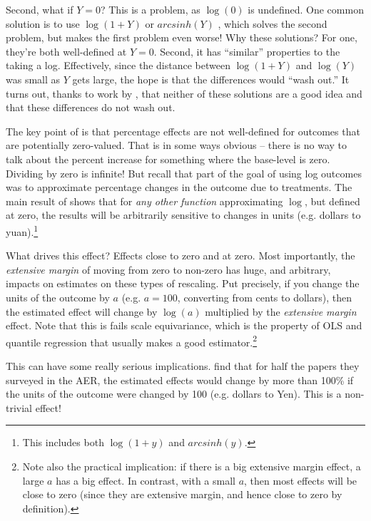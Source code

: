 \documentclass{tufte-handout}
\theoremstyle{break}
\begin{document}
Second, what if $Y = 0$? This is a problem, as $\log(0)$ is undefined. One common solution is to use $\log(1+Y)$ or $arcsinh(Y)$ \citep{MANNING2001461, ravallion2017concave, bellemare2020elasticities}, which solves the second problem, but makes the first problem even worse! \citep{ bellemare2020elasticities, aihounton2021units, cohn2022count} Why these solutions? For one, they're both well-defined at $Y=0$. Second, it has ``similar'' properties to the taking a log. Effectively, since the distance between $\log(1+Y)$ and $\log(Y)$ was small as $Y$ gets large, the hope is that the differences would ``wash out.''  It turns out, thanks to work by \citet{chen2023logs}, that neither of these solutions are a good idea and that these differences do not wash out.

The key point of \citet{chen2023logs} is that percentage effects are not well-defined for outcomes that are potentially zero-valued. That is in some ways obvious -- there is no way to talk about the percent increase for something where the base-level is zero. Dividing by zero is infinite! But recall that part of the goal of using log outcomes was to approximate percentage changes in the outcome due to treatments. The main result of \citet{chen2023logs} shows that for \emph{any other function} approximating $\log$, but defined at zero, the results will be arbitrarily sensitive to changes in units (e.g. dollars to yuan).\footnote{This includes both $\log(1+y)$ and $arcsinh(y)$.}  

What drives this effect? Effects close to zero and at zero. Most importantly, the \emph{extensive margin} of moving from zero to non-zero has huge, and arbitrary, impacts on estimates on these types of rescaling. Put precisely, if you change the units of the outcome by $a$ (e.g. $a=100$, converting from cents to dollars), then the estimated effect will change by $\log(a)$ multiplied by the \emph{extensive margin} effect. Note that this is fails scale equivariance, which is the property of OLS and quantile regression that usually makes a good estimator.\footnote{Note also the practical implication: if there is a big extensive margin effect, a large $a$ has a big effect. In contrast, with a small $a$, then most effects will be close to zero (since they are extensive margin, and hence close to zero by definition).} 

This can have some really serious implications. \citet{chen2023logs} find that for half the papers they surveyed in the AER, the estimated effects would change by more than 100\% if the units of the outcome were changed by 100 (e.g. dollars to Yen). This is a non-trivial effect! 
\end{document}
